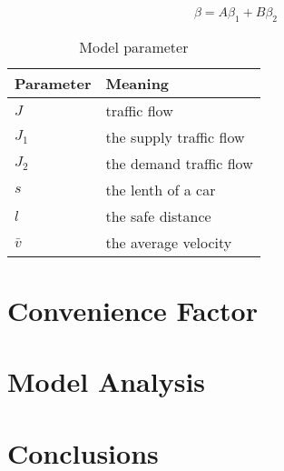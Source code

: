 \begin{displaymath}
\beta = A\beta_1 + B\beta_2
\end{displaymath}


\begin{table}
\centering
\begin{tabular}{ll}
\hline
Parameter & Meaning\\
\hline
$J$ & traffic flow\\
$J_1$ & the supply traffic flow \\
$J_2$ & the demand traffic flow \\
$s$ & the lenth of a car \\
$l$ & the safe distance \\
$\bar{v}$ & the average velocity\\
\hline
\end{tabular}
\caption{Model parameter}
\end{table}


\section{Convenience Factor}\label{sec: Convenience Factor}



\section{Model Analysis}



\section{Conclusions}




